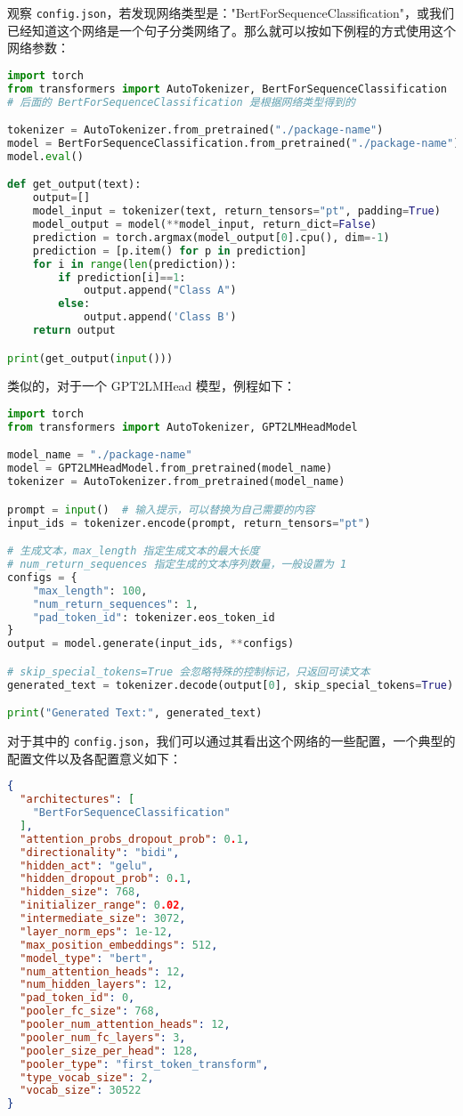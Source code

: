 观察 \verb`config.json`，若发现网络类型是："BertForSequenceClassification"，或我们已经知道这个网络是一个句子分类网络了。那么就可以按如下例程的方式使用这个网络参数：
\begin{lstlisting}[language=python]
import torch
from transformers import AutoTokenizer, BertForSequenceClassification 
# 后面的 BertForSequenceClassification 是根据网络类型得到的

tokenizer = AutoTokenizer.from_pretrained("./package-name")
model = BertForSequenceClassification.from_pretrained("./package-name")
model.eval()

def get_output(text):
    output=[]
    model_input = tokenizer(text, return_tensors="pt", padding=True)
    model_output = model(**model_input, return_dict=False)
    prediction = torch.argmax(model_output[0].cpu(), dim=-1)
    prediction = [p.item() for p in prediction]
    for i in range(len(prediction)):
        if prediction[i]==1:
            output.append("Class A")
        else:
            output.append('Class B')
    return output

print(get_output(input()))
\end{lstlisting}

类似的，对于一个 GPT2LMHead 模型，例程如下：
\begin{lstlisting}[language=python]
import torch
from transformers import AutoTokenizer, GPT2LMHeadModel

model_name = "./package-name"
model = GPT2LMHeadModel.from_pretrained(model_name)
tokenizer = AutoTokenizer.from_pretrained(model_name)

prompt = input()  # 输入提示，可以替换为自己需要的内容
input_ids = tokenizer.encode(prompt, return_tensors="pt")

# 生成文本，max_length 指定生成文本的最大长度
# num_return_sequences 指定生成的文本序列数量，一般设置为 1
configs = {
    "max_length": 100,
    "num_return_sequences": 1,
    "pad_token_id": tokenizer.eos_token_id
}
output = model.generate(input_ids, **configs)

# skip_special_tokens=True 会忽略特殊的控制标记，只返回可读文本
generated_text = tokenizer.decode(output[0], skip_special_tokens=True)

print("Generated Text:", generated_text)
\end{lstlisting}

对于其中的 \verb`config.json`，我们可以通过其看出这个网络的一些配置，一个典型的配置文件以及各配置意义如下：
\begin{lstlisting}[language=json]
{
  "architectures": [
    "BertForSequenceClassification"
  ],
  "attention_probs_dropout_prob": 0.1,
  "directionality": "bidi",
  "hidden_act": "gelu",
  "hidden_dropout_prob": 0.1,
  "hidden_size": 768,
  "initializer_range": 0.02,
  "intermediate_size": 3072,
  "layer_norm_eps": 1e-12,
  "max_position_embeddings": 512,
  "model_type": "bert",
  "num_attention_heads": 12,
  "num_hidden_layers": 12,
  "pad_token_id": 0,
  "pooler_fc_size": 768,
  "pooler_num_attention_heads": 12,
  "pooler_num_fc_layers": 3,
  "pooler_size_per_head": 128,
  "pooler_type": "first_token_transform",
  "type_vocab_size": 2,
  "vocab_size": 30522
}
\end{lstlisting}


